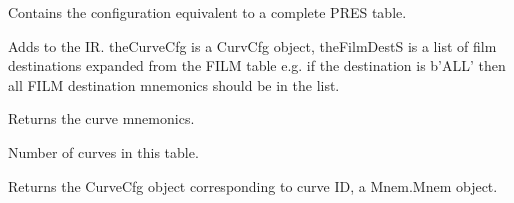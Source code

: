 \documentclass[letterpaper,10pt,english]{sphinxmanual}
\begin{document}

\begin{fulllineitems}
\label{\detokenize{ref/util/plot/PRESCfg:TotalDepth.util.plot.PRESCfg.PresCfg}}
Contains the configuration equivalent to a complete PRES table.

\begin{fulllineitems}
\label{\detokenize{ref/util/plot/PRESCfg:TotalDepth.util.plot.PRESCfg.PresCfg.add}}
Adds to the IR. theCurveCfg is a CurvCfg object, theFilmDestS is a
list of film destinations expanded from the FILM table e.g. if the
destination is b’ALL’ then all FILM destination mnemonics should be in
the list.

\end{fulllineitems}


\begin{fulllineitems}
\label{\detokenize{ref/util/plot/PRESCfg:TotalDepth.util.plot.PRESCfg.PresCfg.keys}}
Returns the curve mnemonics.

\end{fulllineitems}


\begin{fulllineitems}
\label{\detokenize{ref/util/plot/PRESCfg:TotalDepth.util.plot.PRESCfg.PresCfg.__len__}}
Number of curves in this table.

\end{fulllineitems}


\begin{fulllineitems}
\label{\detokenize{ref/util/plot/PRESCfg:TotalDepth.util.plot.PRESCfg.PresCfg.__getitem__}}
Returns the CurveCfg object corresponding to curve ID, a Mnem.Mnem object.

\end{fulllineitems}


\end{fulllineitems}
\end{document}
